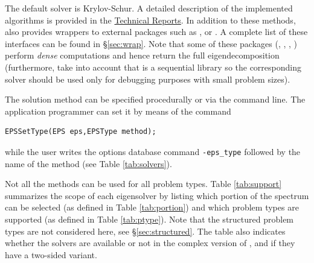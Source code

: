 The default solver is Krylov-Schur. A detailed description of the implemented algorithms is provided in the \hyperlink{str}{\slepc Technical Reports}. In addition to these methods, \slepc also provides wrappers to external packages such as \arpack, or \trlan. A complete list of these interfaces can be found in \S\ref{sec:wrap}. Note that some of these packages (\lapack, \scalapack, \elpa, \elemental) perform \emph{dense} computations and hence return the full eigendecomposition (furthermore, take into account that \lapack is a sequential library so the corresponding solver should be used only for debugging purposes with small problem sizes).

The solution method can be specified procedurally or via the command line. The application programmer can set it by means of the command
        \begin{Verbatim}[fontsize=\small]
        EPSSetType(EPS eps,EPSType method);
        \end{Verbatim}
while the user writes the options database command \Verb!-eps_type! followed by the name of the method (see Table \ref{tab:solvers}).

Not all the methods can be used for all problem types. Table \ref{tab:support} summarizes the scope of each eigensolver by listing which portion of the spectrum can be selected (as defined in Table \ref{tab:portion}) and which problem types are supported (as defined in Table \ref{tab:ptype}). Note that the structured problem types are not considered here, see \S\ref{sec:structured}. The table also indicates whether the solvers are available or not in the complex version of \slepc, and if they have a two-sided variant. %

